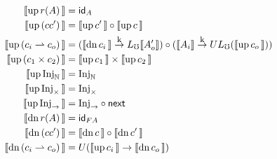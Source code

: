 \begin{figure*}
  \begin{minipage}{0.3\textwidth}
    \begin{footnotesize}
  \begin{align*}
    \sem{\upc{r(A)}} &= \id_A \\
    \sem{\upc{(c \comp c')}} &= \sem{\upc{c'}} \circ \sem{\upc{c}} \\
    \sem{\upc{(c_i \ra c_o)}} &= (\sem{\dnc {c_i}} \tok \li\sem{A_o'})\circ (\sem{A_i} \tok U\li(\sem{\upc {c_o}}))\\
    \sem{\upc{(c_1 \times c_2)}} &= \sem{\upc{c_1}} \times \sem{\upc{c_2}}\\
    \sem{\upc{\inat}} &= \inat\\
    \sem{\upc{\itimes}} &= \itimes\\
    \sem{\upc{\iarr}} &= \iarr \circ \nxt\\
    \sem{\dnc{r(A)}} &= \id_{FA} \\
    \sem{\dnc{(c \comp c')}} &= \sem{\dnc{c}} \circ \sem{\dnc{c'}} \\
    \sem{\dnc{(c_i \ra c_o)}} &= U(\sem{\upc {c_i}} \to \sem{\dnc {c_o}})\\

\end{align*}
\end{footnotesize}
\end{minipage}
\end{figure*}
